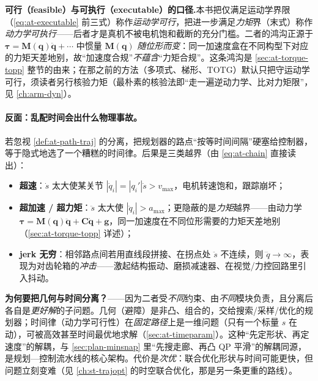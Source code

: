 \begin{note}
\textbf{可行（feasible）与可执行（executable）的口径.}\;本书把仅满足运动学界限（\cref{eq:at-executable} 前三式）称作\emph{运动学可行}，把进一步满足\emph{力矩}界（末式）称作\emph{动力学可执行}——后者才是真机不被电机饱和截断的充分门槛。二者的鸿沟正源于 $\boldsymbol{\tau}=\mathbf{M}(\mathbf{q})\ddot{\mathbf{q}}+\cdots$ 中惯量 $\mathbf{M}(\mathbf{q})$ \emph{随位形而变}：同一加速度盒在不同构型下对应的力矩天差地别，故“加速度合规”\emph{不蕴含}“力矩合规”。这条鸿沟是 \cref{sec:at-torque-topp} 整节的由来；在那之前的方法（多项式、梯形、TOTG）默认只把守运动学可行，须读者另行核验力矩（最朴素的核验法即“走一遍逆动力学、比对力矩限”，见 \cref{ch:arm-dyn}）。
\end{note}

\paragraph{反面：乱配时间会出什么物理事故。}
若忽视 \cref{def:at-path-traj} 的分离，把规划器的路点“按等时间间隔”硬塞给控制器，等于隐式地选了一个糟糕的时间律。后果是三类越界（由 \cref{eq:at-chain} 直接读出）：
\begin{itemize}
  \item \textbf{超速}：$\dot s$ 太大使某关节 $|\dot q_i|=|q_i'|\dot s>v_{\max}$，电机转速饱和，跟踪崩坏；
  \item \textbf{超加速 / 超力矩}：$\ddot s$ 太大使 $|\ddot q_i|>a_{\max}$；更隐蔽的是\emph{力矩}越界——由动力学 $\boldsymbol{\tau}=\mathbf{M}(\mathbf{q})\ddot{\mathbf{q}}+\mathbf{C}\dot{\mathbf{q}}+\mathbf{g}$，同一加速度在不同位形需要的力矩天差地别（\cref{sec:at-torque-topp} 详述）；
  \item \textbf{jerk 无穷}：相邻路点间若用直线段拼接、在拐点处 $\ddot s$ 不连续，则 $\dddot q\to\infty$，表现为对齿轮箱的\emph{冲击}——激起结构振动、磨损减速器、在视觉/力控回路里引入抖动。
\end{itemize}

\begin{insight}
\textbf{为何要把几何与时间分离？}——因为二者受\emph{不同}约束、由\emph{不同}模块负责，且分离后各自是\emph{更好解}的子问题。几何（避障）是非凸、组合的，交给搜索/采样/优化的规划器；时间律（动力学可行性）在\emph{固定路径}上是一维问题（只有一个标量 $s$ 在动），可被高效甚至时间最优地求解（\cref{sec:at-timeparam}）。这种“先定形状、再定速度”的解耦，与 \cref{sec:plan-minsnap} 里“先搜走廊、再凸 QP 平滑”的解耦同源，是规划—控制流水线的核心架构。代价是\emph{次优}：联合优化形状与时间可能更快，但问题立刻变难（见 \cref{ch:st-trajopt} 的时空联合优化，那是另一条更重的路线）。
\end{insight}

